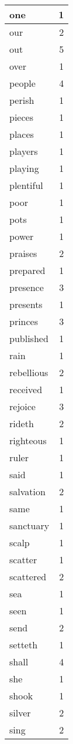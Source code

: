 \begin{center}
\begin{longtable}{l|r}
one & 1 \\ \hline
our & 2 \\ \hline
out & 5 \\ \hline
over & 1 \\ \hline
people & 4 \\ \hline
perish & 1 \\ \hline
pieces & 1 \\ \hline
places & 1 \\ \hline
players & 1 \\ \hline
playing & 1 \\ \hline
plentiful & 1 \\ \hline
poor & 1 \\ \hline
pots & 1 \\ \hline
power & 1 \\ \hline
praises & 2 \\ \hline
prepared & 1 \\ \hline
presence & 3 \\ \hline
presents & 1 \\ \hline
princes & 3 \\ \hline
published & 1 \\ \hline
rain & 1 \\ \hline
rebellious & 2 \\ \hline
received & 1 \\ \hline
rejoice & 3 \\ \hline
rideth & 2 \\ \hline
righteous & 1 \\ \hline
ruler & 1 \\ \hline
said & 1 \\ \hline
salvation & 2 \\ \hline
same & 1 \\ \hline
sanctuary & 1 \\ \hline
scalp & 1 \\ \hline
scatter & 1 \\ \hline
scattered & 2 \\ \hline
sea & 1 \\ \hline
seen & 1 \\ \hline
send & 2 \\ \hline
setteth & 1 \\ \hline
shall & 4 \\ \hline
she & 1 \\ \hline
shook & 1 \\ \hline
silver & 2 \\ \hline
sing & 2 \\ \hline

\end{longtable}
\end{center}
